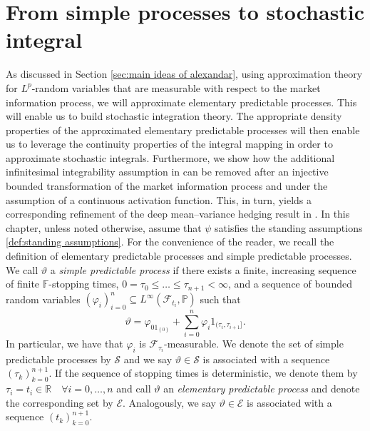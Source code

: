 \documentclass[11pt,a4paper,twoside,openany]{report}
\numberwithin{equation}{section}
\theoremstyle{plain} %
\theoremstyle{definition} %
\theoremstyle{remark} %
\let\parencite\authnumparencite
\begin{document}
\section{From simple processes to stochastic integral}\label{sec:From simple processes to stochastic integral}
As discussed in Section \ref{sec:main ideas of alexandar}, using approximation theory for \(L^p\)-random variables that are measurable with respect to the market information process, we will approximate elementary predictable processes. This will enable us to build stochastic integration theory. The appropriate density properties of the approximated elementary predictable processes will then enable us to leverage the continuity properties of the integral mapping in order to approximate stochastic integrals. 
Furthermore, we show how the additional infinitesimal integrability assumption in \parencite[Thm.~5.32]{Arandjelovic2025} can be removed after an injective bounded transformation of the market information process and under the assumption of a continuous activation function. This, in turn, yields a corresponding refinement of the deep mean–variance hedging result in \parencite[Thm.~5.35]{Arandjelovic2025}. In this chapter, unless noted otherwise, assume that \(\psi\) satisfies the standing assumptions \ref{def:standing assumptions}.
For the convenience of the reader, we recall the definition of elementary predictable processes and simple predictable processes. 
\bigbreak
    We call \(\vartheta\) a \textit{simple predictable process} if there exists a finite, increasing sequence of finite \(\mathbb{F}\)-stopping times, \(0=\tau_0\leq\dots\leq\tau_{n+1}<\infty\), and a sequence of bounded random variables \((\varphi_i)_{i=0}^n\subseteq L^{\infty}(\mathcal{F}_{t_i},\mathbb{P})\) such that 
    \begin{equation}\label{eq:simple representation}
        \vartheta = \varphi_01_{\left\{0\right\}}+\sum_{i=0}^n\varphi_i1_{(\tau_i,\tau_{i+1}]}.
    \end{equation}
In particular, we have that \(\varphi_i\) is \(\mathcal{F}_{\tau_i}\)-measurable. We denote the set of simple predictable processes by \(\mathcal{S}\) and we say \(\vartheta\in\mathcal{S}\) is associated with a sequence \((\tau_k)_{k=0}^{n+1}\). 
\bigbreak
If the sequence of stopping times is deterministic, we denote them by \(\tau_i=t_i\in\mathbb{R}\quad\forall i=0,\dots,n\) and call \(\vartheta\) an \textit{elementary predictable process} and denote the corresponding set by \(\mathcal{E}\). Analogously, we say \(\vartheta\in\mathcal{E}\) is associated with a sequence \((t_k)_{k=0}^{n+1}\).
\end{document}
